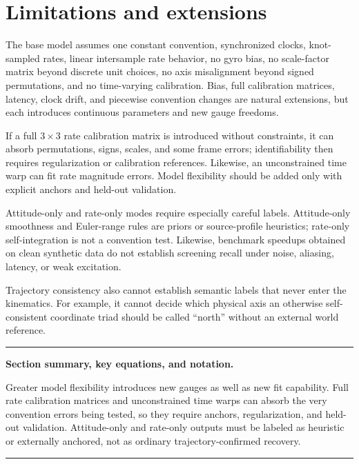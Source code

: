 \documentclass[11pt]{article}
\newenvironment{sectionrecap}
{\par\medskip\begingroup\small\noindent\rule{\linewidth}{0.4pt}\par
\smallskip\noindent\textbf{Section summary, key equations, and notation.}\par\smallskip}
{\par\smallskip\noindent\rule{\linewidth}{0.4pt}\par\endgroup\medskip}
\begin{document}
    \section{Limitations and extensions}\label{app:limits}

    The base model assumes one constant convention, synchronized clocks, knot-sampled rates,
    linear intersample rate behavior, no gyro bias, no scale-factor matrix beyond discrete
    unit choices, no axis misalignment beyond signed permutations, and no time-varying
    calibration. Bias, full calibration matrices, latency, clock drift, and piecewise
    convention changes are natural extensions, but each introduces continuous parameters
    and new gauge freedoms.

    If a full $3\times3$ rate calibration matrix is introduced without constraints, it can
    absorb permutations, signs, scales, and some frame errors; identifiability then requires
    regularization or calibration references. Likewise, an unconstrained time warp can fit
    rate magnitude errors. Model flexibility should be added only with explicit anchors and
    held-out validation.

    Attitude-only and rate-only modes require especially careful labels. Attitude-only smoothness and Euler-range rules are priors or source-profile heuristics; rate-only self-integration is not a convention test. Likewise, benchmark speedups obtained on clean synthetic data do not establish screening recall under noise, aliasing, latency, or weak excitation.

    Trajectory consistency also cannot establish semantic labels that never enter the
    kinematics. For example, it cannot decide which physical axis an otherwise self-consistent
    coordinate triad should be called ``north'' without an external world reference.

    \begin{sectionrecap}
        Greater model flexibility introduces new gauges as well as new fit capability. Full rate
        calibration matrices and unconstrained time warps can absorb the very convention errors
        being tested, so they require anchors, regularization, and held-out validation.
        Attitude-only and rate-only outputs must be labeled as heuristic or externally anchored,
        not as ordinary trajectory-confirmed recovery.
    \end{sectionrecap}
\end{document}
